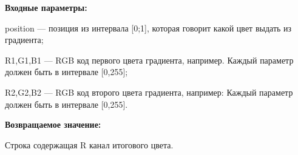 \textbf{Входные параметры:}  

position --- позиция из интервала [0;1], которая говорит какой цвет выдать из градиента;
 
    R1,G1,B1 --- RGB код первого цвета градиента, например. Каждый параметр должен быть в интервале [0,255];
 
    R2,G2,B2 --- RGB код второго цвета градиента, например: Каждый параметр должен быть в интервале [0,255].

\textbf{Возвращаемое значение:}

Строка содержащая R канал итогового цвета.